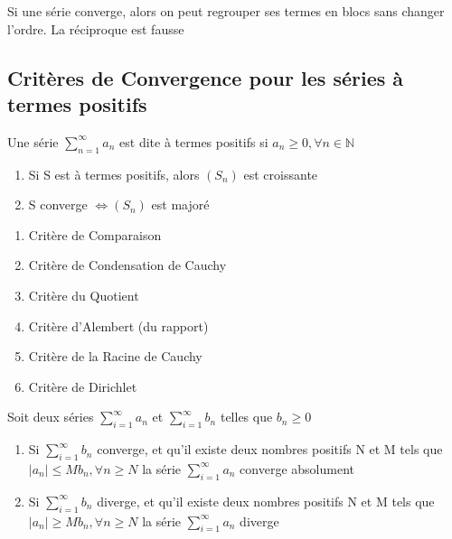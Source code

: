 \documentclass{article}
\begin{document}
\begin{theorem}
    Si une série converge, alors on peut regrouper ses termes en blocs
    sans changer l'ordre. La réciproque est fausse
\end{theorem}

\subsection{Critères de Convergence pour les séries à termes positifs}

\begin{definition}
    Une série $\sum_{n=1}^{\infty} a_n$ est dite à termes positifs si
    $a_n \geq 0, \forall n \in \mathbb{N}$
\end{definition}

\begin{remark}
    \begin{enumerate}
	\item Si S est à termes positifs, alors $(S_n)$ est croissante
	\item S converge $\Longleftrightarrow (S_n)$ est majoré
    \end{enumerate}
\end{remark}

\begin{enumerate}
    \item Critère de Comparaison
    \item Critère de Condensation de Cauchy
    \item Critère du Quotient
    \item Critère d'Alembert (du rapport)
    \item Critère de la Racine de Cauchy
    \item Critère de Dirichlet
\end{enumerate}

\begin{theorem}
    Soit deux séries $ \sum^{\infty}_{i=1} a_n $ et
    $ \sum^{\infty}_{i=1} b_n $ telles que $b_n \geq 0$
    \begin{enumerate}
        \item Si $ \sum^{\infty}_{i=1} b_n $ converge, et qu'il existe
	    deux nombres positifs N et M tels que $|a_n| \leq M b_n,
	    \forall n \geq N$ la série $ \sum^{\infty}_{i=1} a_n $
	    converge absolument
        \item Si $ \sum^{\infty}_{i=1} b_n $ diverge, et qu'il existe
	    deux nombres positifs N et M tels que $|a_n| \geq M b_n,
	    \forall n \geq N$ la série $ \sum^{\infty}_{i=1} a_n $
	    diverge
    \end{enumerate}
\end{theorem}
\end{document}
